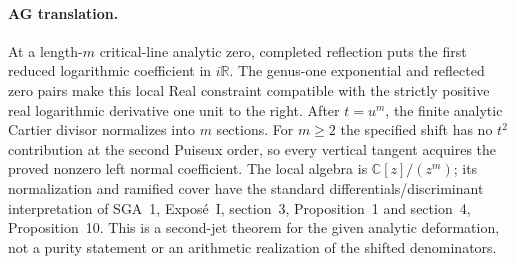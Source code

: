 \paragraph{AG translation.}
At a length-$m$ critical-line analytic zero, completed
reflection puts the first reduced logarithmic coefficient
in $i\mathbb R$. The genus-one exponential and reflected
zero pairs make this local Real constraint compatible with
the strictly positive real logarithmic derivative one unit
to the right. After $t=u^m$, the finite analytic Cartier
divisor normalizes into $m$ sections. For $m\ge2$ the
specified shift has no $t^2$ contribution at the second
Puiseux order, so every vertical tangent acquires the
proved nonzero left normal coefficient. The local algebra
is $\mathbb C[z]/(z^m)$; its normalization and ramified
cover have the standard differentials/discriminant
interpretation of SGA~1, Expos\'e~I, section~3,
Proposition~1 and section~4, Proposition~10. This is a
second-jet theorem for the given analytic deformation,
not a purity statement or an arithmetic realization of
the shifted denominators.
